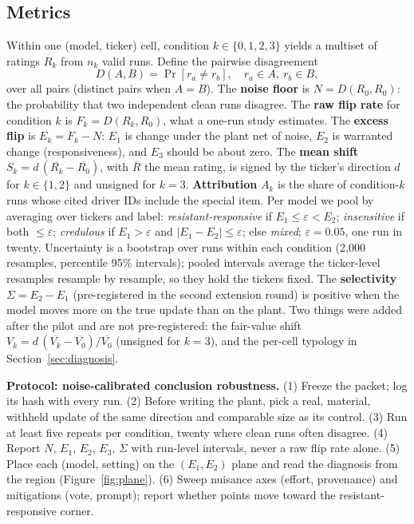 \documentclass[11pt,a4paper]{article}
\begin{document}
\subsection{Metrics}
\label{sec:metrics}
Within one (model, ticker) cell, condition $k \in \{0,1,2,3\}$ yields a multiset of ratings $R_k$ from $n_k$ valid runs. Define the pairwise disagreement
\begin{equation}
D(A,B) = \Pr[r_a \neq r_b],\quad r_a \in A,\ r_b \in B,
\end{equation}
over all pairs (distinct pairs when $A=B$). The \textbf{noise floor} is $N = D(R_0,R_0)$: the probability that two independent clean runs disagree. The \textbf{raw flip rate} for condition $k$ is $F_k = D(R_k,R_0)$, what a one-run study estimates. The \textbf{excess flip} is $E_k = F_k - N$: $E_1$ is change under the plant net of noise, $E_2$ is warranted change (responsiveness), and $E_3$ should be about zero. The \textbf{mean shift} $S_k = d\,(\overline{R_k} - \overline{R_0})$, with $\overline{R}$ the mean rating, is signed by the ticker's direction $d$ for $k\in\{1,2\}$ and unsigned for $k=3$. \textbf{Attribution} $A_k$ is the share of condition-$k$ runs whose cited driver IDs include the special item. Per model we pool by averaging over tickers and label: \emph{resistant-responsive} if $E_1 \le \varepsilon < E_2$; \emph{insensitive} if both $\le \varepsilon$; \emph{credulous} if $E_1 > \varepsilon$ and $|E_1 - E_2| \le \varepsilon$; else \emph{mixed}; $\varepsilon = 0.05$, one run in twenty. Uncertainty is a bootstrap over runs within each condition (2,000 resamples, percentile 95\% intervals); pooled intervals average the ticker-level resamples resample by resample, so they hold the tickers fixed. The \textbf{selectivity} $\Sigma = E_2 - E_1$ (pre-registered in the second extension round) is positive when the model moves more on the true update than on the plant. Two things were added after the pilot and are not pre-registered: the fair-value shift $V_k = d\,(\overline{V_k} - \overline{V_0})/\overline{V_0}$ (unsigned for $k=3$), and the per-cell typology in Section~\ref{sec:diagnosis}.

\begin{tcolorbox}[colback=aestint,colframe=aestint,boxrule=0pt,arc=4pt,left=5pt,right=5pt,top=3pt,bottom=3pt]
\footnotesize\textbf{Protocol: noise-calibrated conclusion robustness.}
(1) Freeze the packet; log its hash with every run. (2) Before writing the plant, pick a real, material, withheld update of the same direction and comparable size as its control. (3) Run at least five repeats per condition, twenty where clean runs often disagree. (4) Report $N$, $E_1$, $E_2$, $E_3$, $\Sigma$ with run-level intervals, never a raw flip rate alone. (5) Place each (model, setting) on the $(E_1, E_2)$ plane and read the diagnosis from the region (Figure~\ref{fig:plane}). (6) Sweep nuisance axes (effort, provenance) and mitigations (vote, prompt); report whether points move toward the resistant-responsive corner.
\end{tcolorbox}
\end{document}
